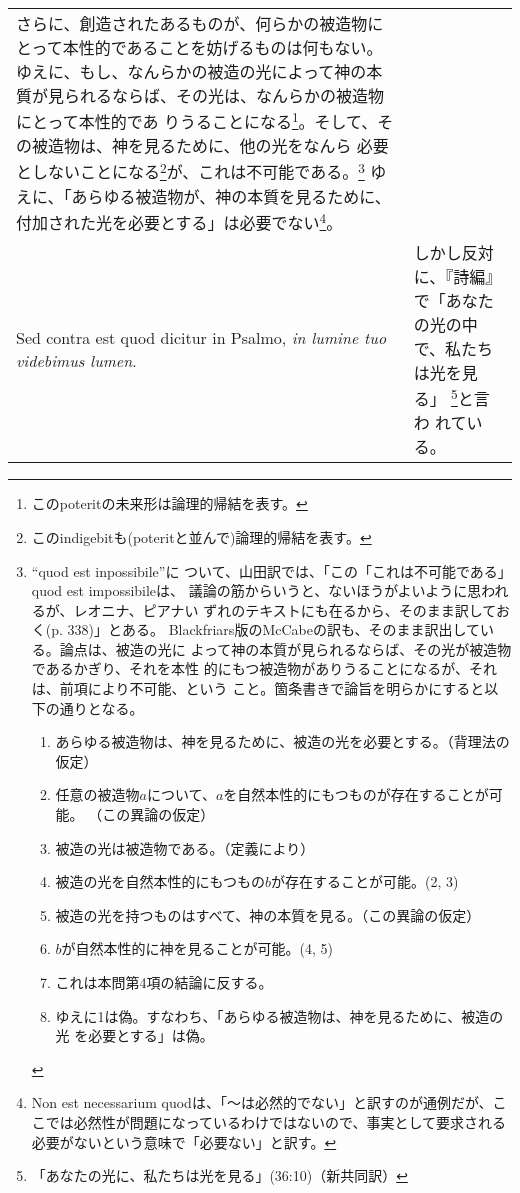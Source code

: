 \documentclass[10pt]{jsarticle} %
\begin{document}
\begin{longtable}{p{21em}p{21em}}
さらに、創造されたあるものが、何らかの被造物にとって本性的であることを妨げるものは何もない。
ゆえに、もし、なんらかの被造の光によって神の本質が見られるならば、その光は、なんらかの被造物にとって本性的であ
りうることになる\footnote{このpoteritの未来形は論理的帰結を表す。}。そして、その被造物は、神を見るために、他の光をなんら
必要としないことになる\footnote{このindigebitも(poteritと並んで)論理的帰結を表す。}が、これは不可能である。\footnote{``quod est inpossibile''に
ついて、山田訳では、「この「これは不可能である」quod est impossibileは、
議論の筋からいうと、ないほうがよいように思われるが、レオニナ、ピアナい
ずれのテキストにも在るから、そのまま訳しておく(p. 338)」とある。
Blackfriars版のMcCabeの訳も、そのまま訳出している。論点は、被造の光に
よって神の本質が見られるならば、その光が被造物であるかぎり、それを本性
的にもつ被造物がありうることになるが、それは、前項により不可能、という
こと。箇条書きで論旨を明らかにすると以下の通りとなる。
\begin{enumerate}
 \item あらゆる被造物は、神を見るために、被造の光を必要とする。（背理法の仮定）
 \item 任意の被造物$a$について、$a$を自然本性的にもつものが存在することが可能。
       （この異論の仮定）
 \item 被造の光は被造物である。（定義により）
 \item 被造の光を自然本性的にもつもの$b$が存在することが可能。(2, 3)
 \item 被造の光を持つものはすべて、神の本質を見る。（この異論の仮定）
 \item $b$が自然本性的に神を見ることが可能。(4, 5)
 \item これは本問第4項の結論に反する。
 \item ゆえに1は偽。すなわち、「あらゆる被造物は、神を見るために、被造の光
       を必要とする」は偽。
\end{enumerate}
}
ゆえに、「あらゆる被造物が、神の本質を見るために、付加された光を必要とする」は必要でない\footnote{Non est necessarium quodは、「〜は必然的でない」と訳すのが通例だが、ここでは必然性が問題になっているわけではないので、事実として要求される必要がないという意味で「必要ない」と訳す。}。

\\

{\sc  Sed contra est} quod dicitur in Psalmo, {\it in lumine tuo videbimus lumen}.

&

しかし反対に、『詩編』で「あなたの光の中で、私たちは光を見る」
\footnote{「あなたの光に、私たちは光を見る」(36:10)（新共同訳）}と言わ
れている。


\end{longtable}
\end{document}
